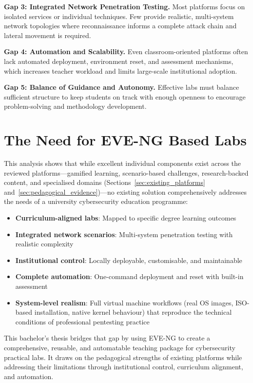 \textbf{Gap 3: Integrated Network Penetration Testing.}
Most platforms focus on isolated services or individual techniques. Few provide realistic,
multi-system network topologies where reconnaissance informs a complete attack chain and
lateral movement is required.

\textbf{Gap 4: Automation and Scalability.}
Even classroom-oriented platforms often lack automated deployment, environment reset, and
assessment mechanisms, which increases teacher workload and limits large-scale institutional
adoption.

\textbf{Gap 5: Balance of Guidance and Autonomy.}
Effective labs must balance sufficient structure to keep students on track with enough
openness to encourage problem-solving and methodology development.


\section{The Need for EVE-NG Based Labs}

This analysis shows that while excellent individual components exist across the reviewed platforms---gamified learning,
scenario-based challenges, research-backed content, and specialised domains (Sections~\ref{sec:existing_platforms} 
and~\ref{sec:pedagogical_evidence})---no existing solution comprehensively addresses the needs of a
university cybersecurity education programme:

\begin{itemize}
    \item \textbf{Curriculum-aligned labs}: Mapped to specific degree learning outcomes
    \item \textbf{Integrated network scenarios}: Multi-system penetration testing with realistic complexity
    \item \textbf{Institutional control}: Locally deployable, customisable, and maintainable
    \item \textbf{Complete automation}: One-command deployment and reset with built-in assessment
    \item \textbf{System-level realism}: Full virtual machine workflows (real OS images, ISO-based
          installation, native kernel behaviour) that reproduce the technical conditions of
          professional pentesting practice
\end{itemize}

This bachelor's thesis bridges that gap by using EVE-NG \cite{eve_ng} to create a
comprehensive, reusable, and automatable teaching package for cybersecurity practical labs.
It draws on the pedagogical strengths of existing platforms while addressing their limitations
through institutional control, curriculum alignment, and automation.



